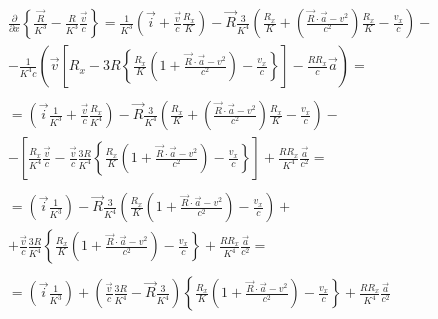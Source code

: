 \documentclass[11pt]{article}
\begin{document}
\[\begin{align}
  & \frac{\partial }{\partial x}\left\{ \frac{\overrightarrow{R}}{{{K}^{3}}}-\frac{R}{{{K}^{3}}}\frac{\overrightarrow{v}}{c} \right\}=\frac{1}{{{K}^{3}}}\left( \overrightarrow{i}+\frac{\overrightarrow{v}}{c}\frac{{{R}_{x}}}{K} \right)-\overrightarrow{R}\frac{3}{{{K}^{4}}}\left( \frac{{{R}_{x}}}{K}+\left( \frac{\overrightarrow{R}\cdot \overrightarrow{a}-{{v}^{2}}}{{{c}^{2}}} \right)\frac{{{R}_{x}}}{K}-\frac{{{v}_{x}}}{c} \right)- \\
 & -\frac{1}{{{K}^{4}}c}\left( \overrightarrow{v}\left[ {{R}_{x}}-3R\left\{ \frac{{{R}_{x}}}{K}\left( 1+\frac{\overrightarrow{R}\cdot \overrightarrow{a}-{{v}^{2}}}{{{c}^{2}}} \right)-\frac{{{v}_{x}}}{c} \right\} \right]-\frac{R{{R}_{x}}}{c}\overrightarrow{a} \right)= \\ 
 &  \\
 & =\left( \overrightarrow{i}\frac{1}{{{K}^{3}}}+\frac{\overrightarrow{v}}{c}\frac{{{R}_{x}}}{{{K}^{4}}} \right)-\overrightarrow{R}\frac{3}{{{K}^{4}}}\left( \frac{{{R}_{x}}}{K}+\left( \frac{\overrightarrow{R}\cdot \overrightarrow{a}-{{v}^{2}}}{{{c}^{2}}} \right)\frac{{{R}_{x}}}{K}-\frac{{{v}_{x}}}{c} \right)- \\
 & -\left[ \frac{{{R}_{x}}}{{{K}^{4}}}\frac{\overrightarrow{v}}{c}-\frac{\overrightarrow{v}}{c}\frac{3R}{{{K}^{4}}}\left\{ \frac{{{R}_{x}}}{K}\left( 1+\frac{\overrightarrow{R}\cdot \overrightarrow{a}-{{v}^{2}}}{{{c}^{2}}} \right)-\frac{{{v}_{x}}}{c} \right\} \right]+\frac{R{{R}_{x}}}{{{K}^{4}}}\frac{\overrightarrow{a}}{{{c}^{2}}}= \\
 &  \\
 & =\left( \overrightarrow{i}\frac{1}{{{K}^{3}}} \right)-\overrightarrow{R}\frac{3}{{{K}^{4}}}\left( \frac{{{R}_{x}}}{K}\left( 1+\frac{\overrightarrow{R}\cdot \overrightarrow{a}-{{v}^{2}}}{{{c}^{2}}} \right)-\frac{{{v}_{x}}}{c} \right)+ \\
 & +\frac{\overrightarrow{v}}{c}\frac{3R}{{{K}^{4}}}\left\{ \frac{{{R}_{x}}}{K}\left( 1+\frac{\overrightarrow{R}\cdot \overrightarrow{a}-{{v}^{2}}}{{{c}^{2}}} \right)-\frac{{{v}_{x}}}{c} \right\}+\frac{R{{R}_{x}}}{{{K}^{4}}}\frac{\overrightarrow{a}}{{{c}^{2}}}= \\
 &  \\
 & =\left( \overrightarrow{i}\frac{1}{{{K}^{3}}} \right)+\left( \frac{\overrightarrow{v}}{c}\frac{3R}{{{K}^{4}}}-\overrightarrow{R}\frac{3}{{{K}^{4}}} \right)\left\{ \frac{{{R}_{x}}}{K}\left( 1+\frac{\overrightarrow{R}\cdot \overrightarrow{a}-{{v}^{2}}}{{{c}^{2}}} \right)-\frac{{{v}_{x}}}{c} \right\}+\frac{R{{R}_{x}}}{{{K}^{4}}}\frac{\overrightarrow{a}}{{{c}^{2}}} \\ 
\end{align}\]
\end{document}

